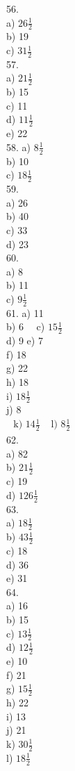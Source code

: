 \documentclass[10pt]{article}
\begin{document}
56.\\
a) \(26 \frac{1}{2}\)\\
b) 19\\
c) \(31 \frac{1}{2}\)\\
57.\\
a) \(21 \frac{1}{2}\)\\
b) 15\\
c) 11\\
d) \(11 \frac{1}{2}\)\\
e) 22\\
58. a) \(8 \frac{1}{2}\)\\
b) 10\\
c) \(18 \frac{1}{2}\)\\
59.\\
a) 26\\
b) 40\\
c) 33\\
d) 23\\
60.\\
a) 8\\
b) 11\\
c) \(9 \frac{1}{2}\)\\
61. a) 11\\
b) \(6 \quad\) c) \(15 \frac{1}{2}\)\\
d) 9 e) 7\\
f) 18\\
g) 22\\
h) 18\\
i) \(18 \frac{1}{2}\)\\
j) 8\\
\(\begin{array}{ll}\text { k) } 14 \frac{1}{2} & \text { l) } 8 \frac{1}{2}\end{array}\)\\
62.\\
a) 82\\
b) \(21 \frac{1}{2}\)\\
c) 19\\
d) \(126 \frac{1}{2}\)\\
63.\\
a) \(18 \frac{1}{2}\)\\
b) \(43 \frac{1}{2}\)\\
c) 18\\
d) 36\\
e) 31\\
64.\\
a) 16\\
b) 15\\
c) \(13 \frac{1}{2}\)\\
d) \(12 \frac{1}{2}\)\\
e) 10\\
f) 21\\
g) \(15 \frac{1}{2}\)\\
h) 22\\
i) 13\\
j) 21\\
k) \(30 \frac{1}{2}\)\\
l) \(18 \frac{1}{2}\)
\end{document}
